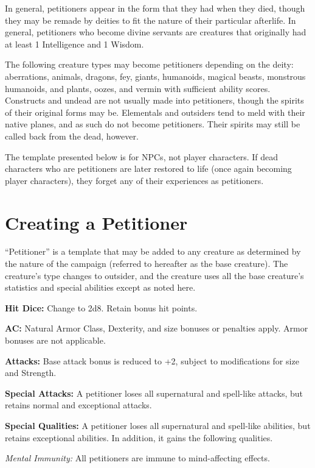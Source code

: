\documentclass{article}
\begin{document}
In general, petitioners appear in the form that they had when they died, though 
they may be remade by deities to fit the nature of their particular afterlife. 
In general, petitioners who become divine servants are creatures that originally 
had at least 1 Intelligence and 1 Wisdom.

The following creature types may become petitioners depending on the deity: aberrations, 
animals, dragons, fey, giants, humanoids, magical beasts, monstrous humanoids, 
and plants, oozes, and vermin with sufficient ability scores. Constructs and undead 
are not usually made into petitioners, though the spirits of their original forms 
may be. Elementals and outsiders tend to meld with their native planes, and as 
such do not become petitioners. Their spirits may still be called back from the 
dead, however.

The template presented below is for NPCs, not player characters. If dead characters 
who are petitioners are later restored to life (once again becoming player characters), 
they forget any of their experiences as petitioners.

\vspace{12pt}
\section*{Creating a Petitioner}

``Petitioner'' is a template that may be added to any creature as determined by 
the nature of the campaign (referred to hereafter as the base creature). The creature's 
type changes to outsider, and the creature uses all the base creature's statistics 
and special abilities except as noted here.

\textbf{Hit Dice: }Change to 2d8. Retain bonus hit points.

\textbf{AC:} Natural Armor Class, Dexterity, and size bonuses or penalties apply. 
Armor bonuses are not applicable.

\textbf{Attacks:} Base attack bonus is reduced to +2, subject to modifications 
for size and Strength.

\textbf{Special Attacks:} A petitioner loses all supernatural and spell-like attacks, 
but retains normal and exceptional attacks.

\textbf{Special Qualities:} A petitioner loses all supernatural and spell-like 
abilities, but retains exceptional abilities. In addition, it gains the following 
qualities.

\textit{Mental Immunity: }All petitioners are immune to mind-affecting effects. 
\end{document}
